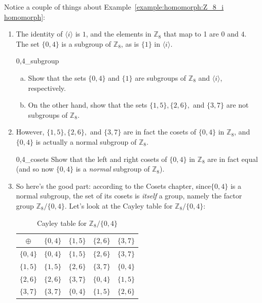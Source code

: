 \begin{rem}\label{homomorph_explore1}
Notice a couple of things about  Example~\ref{example:homomorph:Z_8_i homomorph}:
\begin{enumerate}[(1)]
\item
The identity of $\langle i \rangle$ is $1$, and the elements in ${\mathbb Z}_8$ that map to 1 are  $0$ and $4$. The set $\{0,4\}$ is a subgroup of ${\mathbb Z}_8$, as is $\{1\}$ in $\langle i \rangle$.

\begin{exercise}{0,4_subgroup}
\begin{enumerate}[(a)]
\item
Show that the sets $\{0,4\}$ and $\{1\}$ are subgroups of ${\mathbb Z}_8$ and $\langle i \rangle$, respectively.
\item
On the other hand, show that the sets $\{1,5\}, \{2,6\},$ and $\{3,7\}$ are not subgroups of ${\mathbb Z}_8$.
\end{enumerate}
\end{exercise}

\item
However, $\{1,5\}, \{2,6\},$ and $\{3,7\}$ are in fact the cosets of $\{0,4\}$ in ${\mathbb Z}_8$, and $\{0,4\}$ is actually a normal subgroup of ${\mathbb Z}_8$.

\begin{exercise}{0,4_cosets}
Show that the left and right cosets of $\{0,4\}$ in ${\mathbb Z}_8$ are in fact equal (and so now $\{0,4\}$ is a \emph{normal} subgroup of ${\mathbb Z}_8$).
\end{exercise}

\item
So here's the good part:  according to the Cosets chapter, since$\{0,4\}$ is a normal subgroup, the set of its cosets is \emph{itself} a group, namely the factor group  ${\mathbb Z}_8/ \{0,4\}$.  Let's look at the Cayley table for ${\mathbb Z}_8/ \{0,4\}$:

\begin{table}[H]
\caption{Cayley table for ${\mathbb Z}_8/ \{0,4\}$}
\label{Z8_04_factor}
{\small
\begin{center}
\begin{tabular}{c|cccc}
$\oplus$ & $\{0,4\}$ &$\{1,5\}$ &$\{2,6\}$ & $\{3,7\}$  \\
\hline
$\{0,4\}$   & $\{0,4\}$ &$\{1,5\}$ &$\{2,6\}$ & $\{3,7\}$  \\
$\{1,5\}$  &$\{1,5\}$ &$\{2,6\}$ & $\{3,7\}$ & $\{0,4\}$  \\
$\{2,6\}$   &$\{2,6\}$ & $\{3,7\}$  & $\{0,4\}$ &$\{1,5\}$ \\
$\{3,7\}$  & $\{3,7\}$ & $\{0,4\}$ &$\{1,5\}$ &$\{2,6\}$  \\


\end{tabular}
\end{center}}
\end{table}
\end{enumerate}
\end{rem}
